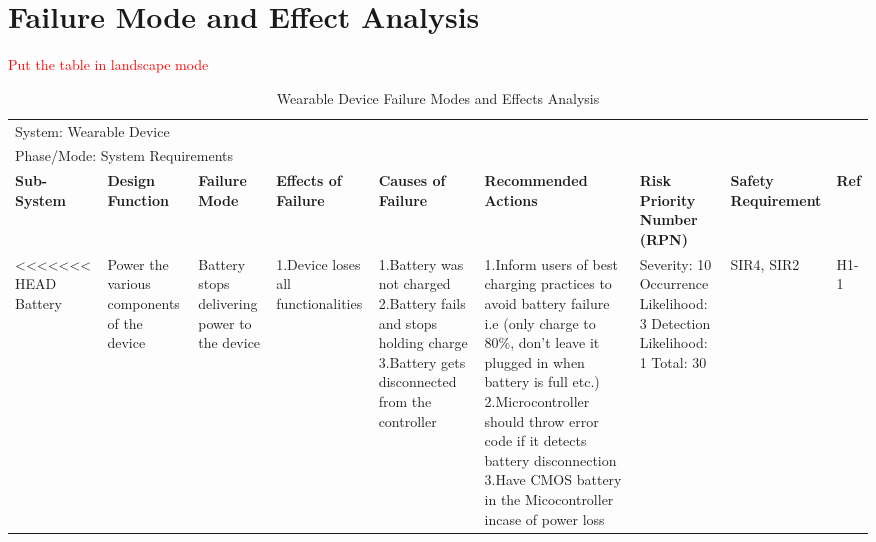 \documentclass[12pt, titlepage]{article}
\begin{document}
\section{Failure Mode and Effect Analysis}
\textcolor{red}{Put the table in landscape mode}

\begin{landscape}
\begin{table}[H]
\centering
    \caption{Wearable Device Failure Modes and Effects Analysis}
	
    \begin{tabular}{| p{} | p{}  | p{} | p{} | p{} | p{} | p{} | p{} | p{} |}
    \hline
    
    \multicolumn{9}{|l|}{System: Wearable Device} \\
    \multicolumn{9}{|l|}{Phase/Mode: System Requirements} \\ \hline
    \textbf{Sub-System} & \textbf{Design Function} & \textbf{Failure Mode} & \textbf{Effects of Failure} & \textbf{Causes of Failure} & \textbf{Recommended Actions} & \textbf{Risk Priority Number (RPN)} & \textbf{Safety Requirement} & \textbf{Ref} \\ \hline

<<<<<<< HEAD
    Battery & Power the various components of the device  & Battery stops delivering power to the device & 1.Device loses all functionalities & 1.Battery was not charged \newline 2.Battery fails and stops holding charge \newline 3.Battery gets disconnected from the controller & 1.Inform users of best charging practices to avoid battery failure i.e (only charge to 80\%, don't leave it plugged in when battery is full etc.) \newline 2.Microcontroller should throw error code if it detects battery disconnection \newline 3.Have CMOS battery in the Micocontroller incase of power loss & Severity: 10 \newline Occurrence Likelihood: 3 \newline Detection Likelihood: 1 \newline Total: 30 & SIR4, SIR2 & H1-1 \\ \cline{1-9}
    
    \end{tabular}

\end{table}
    

\end{landscape}
\end{document}
